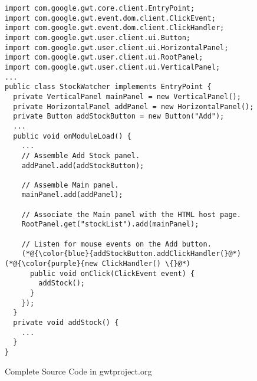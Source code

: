 \begin{figure}[htbp]
	\centering
\begin{lstlisting}[]
import com.google.gwt.core.client.EntryPoint;
import com.google.gwt.event.dom.client.ClickEvent;
import com.google.gwt.event.dom.client.ClickHandler;
import com.google.gwt.user.client.ui.Button;
import com.google.gwt.user.client.ui.HorizontalPanel;
import com.google.gwt.user.client.ui.RootPanel;
import com.google.gwt.user.client.ui.VerticalPanel;
...
public class StockWatcher implements EntryPoint {
  private VerticalPanel mainPanel = new VerticalPanel();
  private HorizontalPanel addPanel = new HorizontalPanel();
  private Button addStockButton = new Button("Add");
  ...
  public void onModuleLoad() {
    ...
    // Assemble Add Stock panel.
    addPanel.add(addStockButton);

    // Assemble Main panel.
    mainPanel.add(addPanel);

    // Associate the Main panel with the HTML host page.
    RootPanel.get("stockList").add(mainPanel);

    // Listen for mouse events on the Add button.
    (*@{\color{blue}{addStockButton.addClickHandler(}@*) (*@{\color{purple}{new ClickHandler() \{}@*)
      public void onClick(ClickEvent event) {
        addStock();
      }
    });
  }
  private void addStock() {
    ...
  }
}
\end{lstlisting}
        \vspace{-12pt}
        \caption{Complete Source Code in gwtproject.org}
        \label{fig:example3}
\end{figure}
